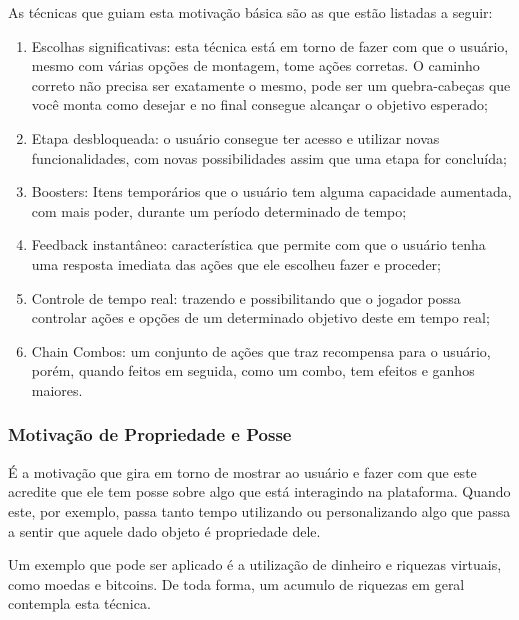 As técnicas que guiam esta motivação básica são as que estão listadas
a seguir:

\begin{enumerate}
    \item Escolhas significativas: esta técnica está em torno de fazer
        com que o usuário, mesmo com várias opções de montagem,
        tome ações corretas. O caminho correto não precisa ser exatamente o mesmo,
        pode ser um quebra-cabeças que você monta como desejar e no final
        consegue alcançar o objetivo esperado;
    \item Etapa desbloqueada: o usuário consegue ter acesso
        e utilizar novas funcionalidades, com novas possibilidades
        assim que uma etapa for concluída;
    \item Boosters: Itens temporários que o usuário tem alguma
        capacidade aumentada, com mais poder, durante um período
        determinado de tempo;
    \item Feedback instantâneo: característica que permite com que o usuário
        tenha uma resposta imediata das ações que ele escolheu fazer e proceder;
    \item Controle de tempo real: trazendo e possibilitando que o jogador
        possa controlar ações e opções de um determinado objetivo deste
        em tempo real;
    \item Chain Combos: um conjunto de ações que traz recompensa para o
        usuário, porém, quando feitos em seguida, como um combo, tem
        efeitos e ganhos maiores.
\end{enumerate}

\subsubsection{Motivação de Propriedade e Posse}
\label{sub:propriedadeeposse}
É a motivação que gira em torno de mostrar ao usuário e fazer com que
este acredite que ele tem posse sobre algo que está interagindo na
plataforma. Quando este, por exemplo, passa tanto tempo utilizando
ou personalizando algo que passa a sentir que aquele dado objeto
é propriedade dele.

Um exemplo que pode ser aplicado é a utilização de dinheiro e riquezas
virtuais, como moedas e bitcoins. De toda forma, um acumulo de riquezas
em geral contempla esta técnica.

